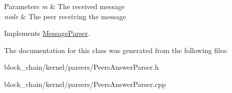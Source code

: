 \begin{DoxyParams}{Parameters}
{\em m} & The received message \\
\hline
{\em node} & The peer receiving the message \\
\hline
\end{DoxyParams}


Implements \mbox{\hyperlink{classMessageParser_a946f3b936dc01a75d6165329b159ecfe}{Message\+Parser}}.



The documentation for this class was generated from the following files\+:\begin{DoxyCompactItemize}
\item 
block\+\_\+chain/kernel/parsers/Peers\+Answer\+Parser.\+h\item 
block\+\_\+chain/kernel/parsers/Peers\+Answer\+Parser.\+cpp\end{DoxyCompactItemize}
